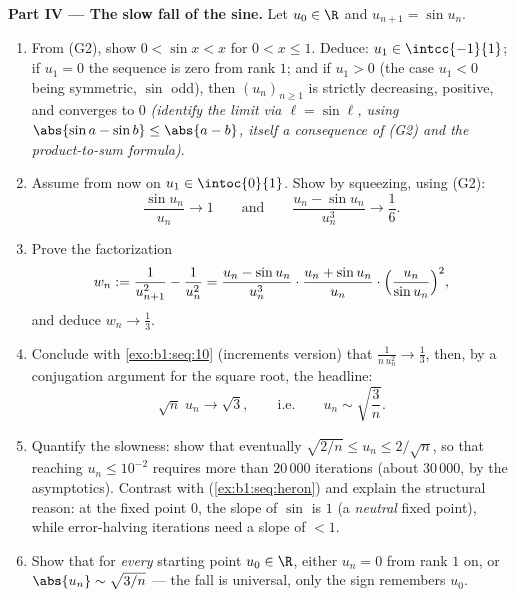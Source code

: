\begin{problem}[{Weekend problem --- the Ces\`aro--Stolz theorem
and the asymptotics $u_n \sim \sqrt{3/n}$ for $u_{n+1} = \sin
u_n$}]
\medskip
\noindent\textbf{Part IV --- The slow fall of the sine.} Let
$u_0 \in \R$ and $u_{n+1} = \sin u_n$.
\begin{enumerate}[resume]
  \item From (G2), show $0 < \sin x < x$ for $0 < x \leq 1$.
        Deduce: $u_1 \in \intcc{-1}{1}$; if $u_1 = 0$ the
        sequence is zero from rank $1$; and if $u_1 > 0$ (the
        case $u_1 < 0$ being symmetric, $\sin$ odd), then
        $(u_n)_{n \geq 1}$ is strictly decreasing, positive, and
        converges to $0$ \emph{(identify the limit via $\ell =
        \sin \ell$, using $\abs{\sin a - \sin b} \leq \abs{a -
        b}$, itself a consequence of (G2) and the product-to-sum
        formula)}.
  \item Assume from now on $u_1 \in \intoc{0}{1}$. Show by
        squeezing, using (G2):
        \[
        \frac{\sin u_n}{u_n} \to 1
        \qquad\text{and}\qquad
        \frac{u_n - \sin u_n}{u_n^{3}} \to \frac16 .
        \]
  \item Prove the factorization
        \[
        w_n := \frac{1}{u_{n+1}^{2}} - \frac{1}{u_n^{2}}
        = \frac{u_n - \sin u_n}{u_n^{3}} \cdot
        \frac{u_n + \sin u_n}{u_n} \cdot
        \Bigl(\frac{u_n}{\sin u_n}\Bigr)^{2},
        \]
        and deduce $w_n \to \frac13$.
  \item Conclude with \cref{exo:b1:seq:10} (increments version)
        that $\frac{1}{n\,u_n^{2}} \to \frac13$, then, by a
        conjugation argument for the square root, the headline:
        \[
        \sqrt n\;u_n \longrightarrow \sqrt 3 ,
        \qquad\text{i.e.}\qquad
        u_n \sim \sqrt{\frac 3n} .
        \]
  \item Quantify the slowness: show that eventually $\sqrt{2/n}
        \leq u_n \leq 2/\sqrt n$, so that reaching $u_n \leq
        10^{-2}$ requires more than $20\,000$ iterations (about
        $30\,000$, by the asymptotics). Contrast with  (\cref{ex:b1:seq:heron}) and explain the
        structural reason: at the fixed point $0$, the slope of
        $\sin$ is $1$ (a \emph{neutral} fixed point), while
        error-halving iterations need a slope of  $< 1$.
  \item Show that for \emph{every} starting point $u_0 \in \R$,
        either $u_n = 0$ from rank $1$ on, or $\abs{u_n} \sim
        \sqrt{3/n}$ --- the fall is universal, only the sign
        remembers $u_0$.
\end{enumerate}


\end{problem}
